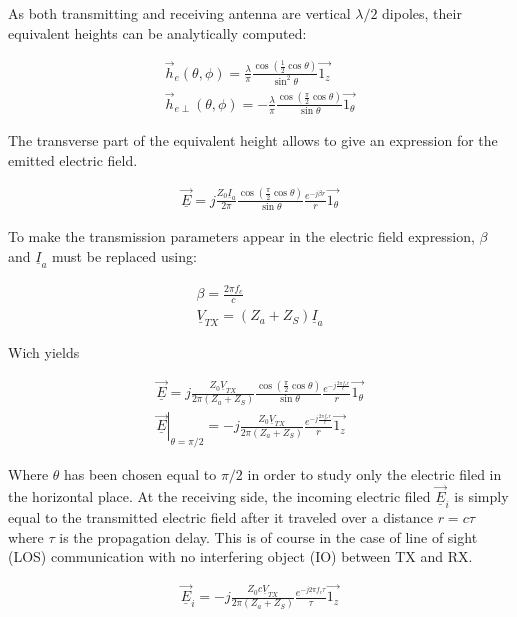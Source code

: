 \documentclass[10pt,a4paper]{ULBreport}
\begin{document}
As both transmitting and receiving antenna are vertical $\lambda/2$ dipoles, their equivalent heights can be analytically computed:

\begin{align*}
    \vec{h}_e (\theta, \phi) = \frac{\lambda}{\pi} \frac{\cos(\frac{1}{2}\cos \theta)}{\sin ^2 \theta}\vec{1_z}\\
    \vec{h}_{e\perp} (\theta, \phi) = -\frac{\lambda}{\pi} \frac{\cos(\frac{\pi}{2}\cos \theta)}{\sin \theta}\vec{1_\theta}
\end{align*}

The transverse part of the equivalent height allows to give an expression for the emitted electric field.

\begin{align*}
    \underline{\vec{E}} = j\frac{Z_0\underline{I}_a}{2\pi}\frac{\cos(\frac{\pi}{2}\cos \theta)}{\sin \theta}\frac{e^{-j\beta r}}{r}\vec{1_\theta}
\end{align*}

To make the transmission parameters appear in the electric field expression, $\beta$ and $\underline{I}_a$ must be replaced using:

\begin{align*}
    \beta = \frac{2\pi f_c}{c}\\
    \underline{V}_{TX} = (Z_a + Z_S) \underline{I}_a
\end{align*}

Wich yields

\begin{align*}
    \underline{\vec{E}} = j\frac{Z_0\underline{V}_{TX}}{2\pi (Z_a + Z_S)}\frac{\cos(\frac{\pi}{2}\cos \theta)}{\sin \theta}\frac{e^{-j \frac{2\pi f_c r}{c}}}{r}\vec{1_\theta}\\
    \left . \underline{\vec{E}}\right\vert_{\theta = \pi/2} = -j\frac{Z_0\underline{V}_{TX}}{2\pi (Z_a + Z_S)}\frac{e^{-j \frac{2\pi f_c r}{c}}}{r}\vec{1_z}
\end{align*}

Where $\theta$ has been chosen equal to $\pi /2$ in order to study only the electric filed in the horizontal place. At the receiving side, the incoming electric filed $\underline{\vec{E}}_i$ is simply equal to the transmitted electric field after it traveled over a distance $r = c\tau$ where $\tau$ is the propagation delay. This is of course in the case of line of sight (LOS) communication with no interfering object (IO) between TX and RX.

\begin{align*}
    \underline{\vec{E}}_i = -j\frac{Z_0 c \underline{V}_{TX}}{2\pi (Z_a + Z_S)}\frac{e^{-j 2\pi f_c \tau}}{\tau}\vec{1_z}
\end{align*}
\end{document}
